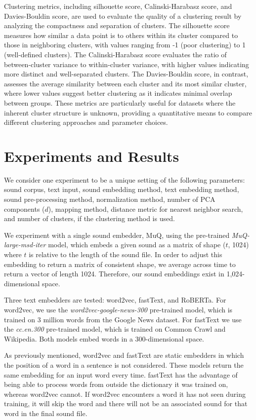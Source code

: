 \documentclass[twoside,a4paper]{article}
\begin{document}
Clustering metrics, including silhouette score, Calinski-Harabasz score, and Davies-Bouldin score, are used to evaluate the quality of a clustering result by analyzing the compactness and separation of clusters. The silhouette score measures how similar a data point is to others within its cluster compared to those in neighboring clusters, with values ranging from -1 (poor clustering) to 1 (well-defined clusters). The Calinski-Harabasz score evaluates the ratio of between-cluster variance to within-cluster variance, with higher values indicating more distinct and well-separated clusters. The Davies-Bouldin score, in contrast, assesses the average similarity between each cluster and its most similar cluster, where lower values suggest better clustering as it indicates minimal overlap between groups. These metrics are particularly useful for datasets where the inherent cluster structure is unknown, providing a quantitative means to compare different clustering approaches and parameter choices.

\section{Experiments and Results}

We consider one experiment to be a unique setting of the following parameters: sound corpus, text input, sound embedding method, text embedding method, sound pre-processing method, normalization method, number of PCA components ($d$), mapping method, distance metric for nearest neighbor search, and number of clusters, if the clustering method is used.

We experiment with a single sound embedder, MuQ, using the pre-trained \textit{MuQ-large-msd-iter} model, which embeds a given sound as a matrix of shape ($t$, 1024) where $t$ is relative to the length of the sound file. In order to adjust this embedding to return a matrix of consistent shape, we average across time to return a vector of length 1024. Therefore, our sound embeddings exist in 1,024-dimensional space. 

Three text embedders are tested: word2vec, fastText, and RoBERTa. For word2vec, we use the \textit{word2vec-google-news-300} pre-trained model, which is trained on 3 million words from the Google News dataset. For fastText we use the \textit{cc.en.300} pre-trained model, which is trained on Common Crawl and Wikipedia. Both models embed words in a 300-dimensional space.

As previously mentioned, word2vec and fastText are static embedders in which the position of a word in a sentence is not considered. These models return the same embedding for an input word every time. fastText has the advantage of being able to process words from outside the dictionary it was trained on, whereas word2vec cannot. If word2vec encounters a word it has not seen during training, it will skip the word and there will not be an associated sound for that word in the final sound file.
\end{document}
